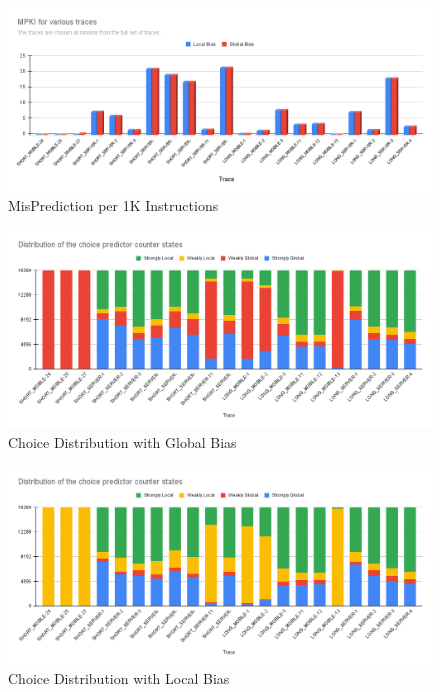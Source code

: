 \documentclass[12pt,a4paper,english]{paper}
\begin{document}
\begin{figure}[H]
    \centering
    \includegraphics[scale=0.4]{MPKI for various traces.png}
    \caption{MisPrediction per 1K Instructions}
\end{figure}
\begin{figure}[H]
    \centering
    \includegraphics[scale=0.4]{Distribution of the choice predictor counter states_Global.png}
    \caption{Choice Distribution with Global Bias}
\end{figure}
\begin{figure}[H]
    \centering
    \includegraphics[scale=0.4]{Distribution of the choice predictor counter states_Local.png}
    \caption{Choice Distribution with Local Bias}
\end{figure}
\end{document}

